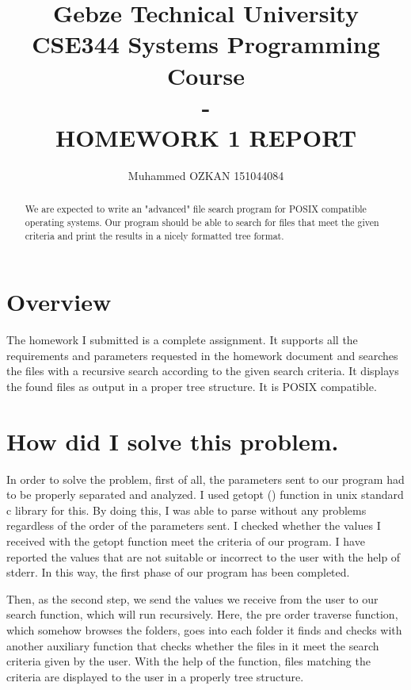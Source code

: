 \documentclass{article}
\begin{document}
\title{Gebze Technical University\\CSE344 Systems Programming Course\\ -\\HOMEWORK 1 REPORT}
\author{Muhammed OZKAN 151044084}

\maketitle

\begin{abstract}
We are expected to write an "advanced" file search program for POSIX compatible operating systems. Our program should be able to search for files that meet the given criteria and print the results in a nicely formatted tree format.
\end{abstract}

\section{Overview}
\quad The homework I submitted is a complete assignment. It supports all the requirements and parameters requested in the homework document and searches the files with a recursive search according to the given search criteria. It displays the found files as output in a proper tree structure. It is POSIX compatible.\\

\section{How did I solve this problem.}
\quad In order to solve the problem, first of all, the parameters sent to our program had to be properly separated and analyzed. I used getopt () function in unix standard c library for this. By doing this, I was able to parse without any problems regardless of the order of the parameters sent. I checked whether the values I received with the getopt function meet the criteria of our program. I have reported the values that are not suitable or incorrect to the user with the help of stderr. In this way, the first phase of our program has been completed. \par Then, as the second step, we send the values we receive from the user to our search function, which will run recursively. Here, the pre order traverse function, which somehow browses the folders, goes into each folder it finds and checks with another auxiliary function that checks whether the files in it meet the search criteria given by the user. With the help of the function, files matching the criteria are displayed to the user in a properly tree structure.\\
\end{document}
